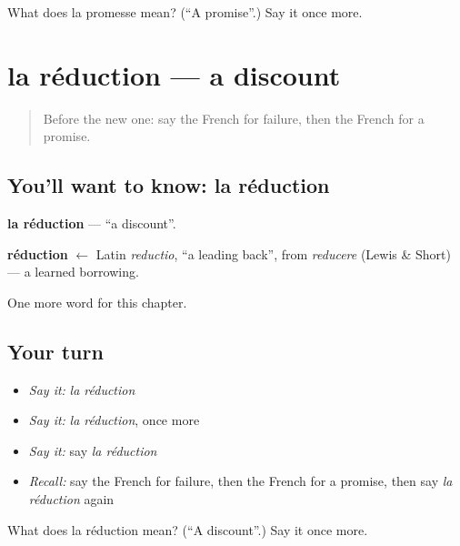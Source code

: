 \begin{tcolorbox}[breakable,colback=teal!4,colframe=teal!35!black,title={Before you move on}]
What does la promesse mean? (\textquotedblleft{}A promise\textquotedblright{}.) Say it once more.
\end{tcolorbox}
\section[la réduction]{la réduction — a discount}

\label{lesson:FR-C198-reduction}



\begin{quote}
Before the new one: say the French for failure, then the French for a promise.
\end{quote}

\subsection*{You'll want to know: la réduction}
\textbf{la réduction} — \textquotedblleft{}a discount\textquotedblright{}.

\begin{cousinweb}
\textbf{réduction} $\leftarrow$ Latin \emph{reductio}, \textquotedblleft{}a leading back\textquotedblright{}, from \emph{reducere} (Lewis \& Short) — a learned borrowing.
\end{cousinweb}

\begin{grammarlens}[title={What you've built}]
One more word for this chapter.
\end{grammarlens}

\subsection*{Your turn}
\begin{itemize}
\raggedright
  \item \emph{Say it:} \emph{la réduction}
  \item \emph{Say it:} \emph{la réduction}, once more
  \item \emph{Say it:} say \emph{la réduction}
  \item \emph{Recall:} say the French for failure, then the French for a promise, then say \emph{la réduction} again
\end{itemize}

\begin{tcolorbox}[breakable,colback=teal!4,colframe=teal!35!black,title={Before you move on}]
What does la réduction mean? (\textquotedblleft{}A discount\textquotedblright{}.) Say it once more.
\end{tcolorbox}
